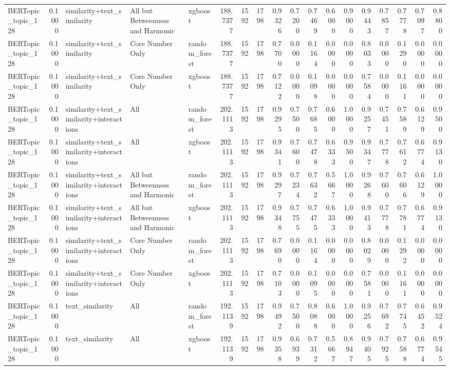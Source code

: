 \begin{tabular}{lrlllrrrrrrrrrrrrr}
BERTopic_topic_128 & 0.1000 & similarity+text_similarity & All but Betweenness and Harmonic & xgboost & 188.7377 & 1592 & 1798 & 0.9326 & 0.7200 & 0.7469 & 0.6000 & 0.9000 & 0.9443 & 0.7857 & 0.7778 & 0.7097 & 0.8800 \\
BERTopic_topic_128 & 0.1000 & similarity+text_similarity & Core Number Only & random_forest & 188.7377 & 1592 & 1798 & 0.7700 & 0.0000 & 0.1164 & 0.0000 & 0.0000 & 0.8033 & 0.0000 & 0.1290 & 0.0000 & 0.0000 \\
BERTopic_topic_128 & 0.1000 & similarity+text_similarity & Core Number Only & xgboost & 188.7377 & 1592 & 1798 & 0.7122 & 0.0000 & 0.1098 & 0.0000 & 0.0000 & 0.7584 & 0.0000 & 0.1161 & 0.0000 & 0.0000 \\
BERTopic_topic_128 & 0.1000 & similarity+text_similarity+interactions & All & random_forest & 202.1113 & 1592 & 1798 & 0.9295 & 0.7500 & 0.7685 & 0.6000 & 1.0000 & 0.9257 & 0.7451 & 0.7589 & 0.6129 & 0.9500 \\
BERTopic_topic_128 & 0.1000 & similarity+text_similarity+interactions & All & xgboost & 202.1113 & 1592 & 1798 & 0.9341 & 0.7600 & 0.7478 & 0.6333 & 0.9500 & 0.9347 & 0.7778 & 0.7612 & 0.6774 & 0.9130 \\
BERTopic_topic_128 & 0.1000 & similarity+text_similarity+interactions & All but Betweenness and Harmonic & random_forest & 202.1113 & 1592 & 1798 & 0.9297 & 0.7234 & 0.7632 & 0.5667 & 1.0000 & 0.9268 & 0.7600 & 0.7606 & 0.6129 & 1.0000 \\
BERTopic_topic_128 & 0.1000 & similarity+text_similarity+interactions & All but Betweenness and Harmonic & xgboost & 202.1113 & 1592 & 1798 & 0.9348 & 0.7755 & 0.7475 & 0.6333 & 1.0000 & 0.9413 & 0.7778 & 0.7781 & 0.6774 & 0.9130 \\
BERTopic_topic_128 & 0.1000 & similarity+text_similarity+interactions & Core Number Only & random_forest & 202.1113 & 1592 & 1798 & 0.7690 & 0.0000 & 0.1164 & 0.0000 & 0.0000 & 0.8029 & 0.0000 & 0.1292 & 0.0000 & 0.0000 \\
BERTopic_topic_128 & 0.1000 & similarity+text_similarity+interactions & Core Number Only & xgboost & 202.1113 & 1592 & 1798 & 0.7103 & 0.0000 & 0.1095 & 0.0000 & 0.0000 & 0.7581 & 0.0000 & 0.1161 & 0.0000 & 0.0000 \\
BERTopic_topic_128 & 0.1000 & text_similarity & All & random_forest & 192.1139 & 1592 & 1798 & 0.9492 & 0.7500 & 0.8088 & 0.6000 & 1.0000 & 0.9256 & 0.7692 & 0.7745 & 0.6452 & 0.9524 \\
BERTopic_topic_128 & 0.1000 & text_similarity & All & xgboost & 192.1139 & 1592 & 1798 & 0.9358 & 0.6939 & 0.7312 & 0.5667 & 0.8947 & 0.9405 & 0.7925 & 0.7588 & 0.6774 & 0.9545 \\

\end{tabular}
